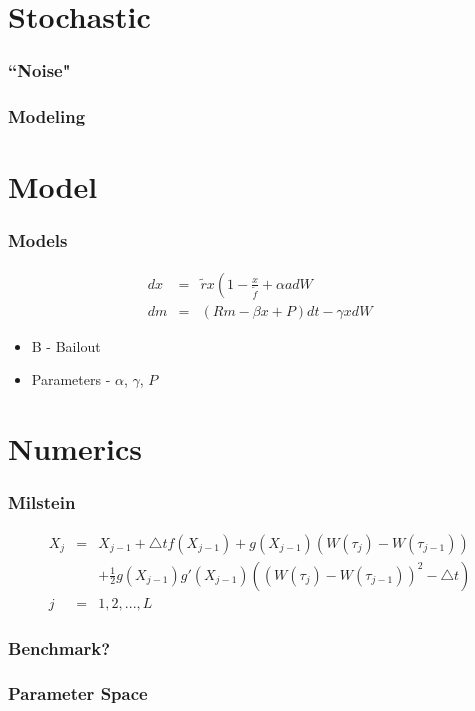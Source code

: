 



\section{Stochastic}

\begin{frame}
    \frametitle{``Noise"}
\end{frame}

\begin{frame}
    \frametitle{Modeling}
\end{frame}






\section{Model}

\begin{frame}
    \frametitle{Models}
	\begin{eqnarray}
		dx &=& \tilde{r} x \left( 1- \frac{x}{\tilde{f}} +\alpha a dW \\
		dm &=& (Rm - \beta x + P) dt - \gamma x dW
	\end{eqnarray}
	\begin{itemize}
		\item B - Bailout
		\item Parameters - $\alpha$, $\gamma$, $P$
	\end{itemize}
\end{frame}





\section{Numerics}

\begin{frame}
    \frametitle{Milstein}
	\begin{eqnarray*}
		X_{j} &=& X_{j-1} + \triangle tf(X_{j-1}) + g(X_{j-1})(W(\tau_{j})-W(\tau_{j-1})) 			\nonumber\\ 
		&& + \frac{1}{2} g(X_{j-1})g'(X_{j-1})((W(\tau_{j})-W(\tau_{j-1}))^{2}-\triangle t)
		\\ j &=& 1,2,... ,L
	\end{eqnarray*}

\end{frame}


\begin{frame}
    \frametitle{Benchmark?}
\end{frame}


\begin{frame}
    \frametitle{Parameter Space}
\end{frame}



